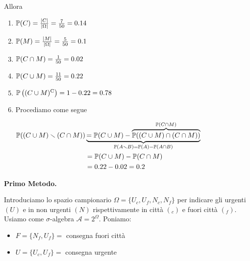 \begin{enumerate}
Allora
\begin{enumerate}
\item $\mathbb{P}( C) =\frac{| C| }{| \Omega | } =\frac{7}{50} =0.14$
\item $\mathbb{P}( M) =\frac{| M| }{| \Omega | } =\frac{5}{50} =0.1$
\item $\mathbb{P}( C\cap M) =\frac{1}{50} =0.02$
\item $\mathbb{P}( C\cup M) =\frac{11}{50} =0.22$
\item $\mathbb{P}\left(( C\cup M)^{\mathrm{C}}\right) =1-0.22=0.78$
\item Procediamo come segue

$\begin{aligned}
\mathbb{P}(( C\cup M) \smallsetminus ( C\cap M)) & \underbrace{=\mathbb{P}( C\cup M) -\overbrace{\mathbb{P}(( C\cup M) \cap ( C\cap M))}^{\mathbb{P}( C\cap M)}}_{\mathbb{P}( A\smallsetminus B) =\mathbb{P}( A) -\mathbb{P}( A\cap B)}\\
 & =\mathbb{P}( C\cup M) -\mathbb{P}( C\cap M)\\
 & =0.22-0.02=0.2
\end{aligned}$
\end{enumerate}
\end{enumerate}
\Soluzione

\textbf{Primo Metodo.}

Introduciamo lo spazio campionario $\Omega =\{U_{c} ,U_{f} ,N_{c} ,N_{f}\}$ per indicare gli urgenti $( U)$ e in non urgenti $( N)$ rispettivamente in città $(_{c})$ e fuori città $(_{f})$. Usiamo come $\sigma $-algebra $\mathcal{A} =2^{\Omega }$. Poniamo:
\begin{itemize}
\item $F=\{N_{f} ,U_{f}\} =$ consegna fuori città
\item $U=\{U_{c} ,U_{f}\} =$ consegna urgente
\end{itemize}

